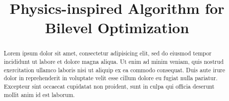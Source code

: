 \documentclass[conference]{IEEEtran}
\begin{document}
%
\title{Physics-inspired Algorithm for \\ Bilevel Optimization}


\author{
\and
}

\maketitle

\thispagestyle{firststyle}
\renewcommand{\headrulewidth}{0in}
\pagestyle{empty}


\pagestyle{fancy}



\begin{abstract}
Lorem ipsum dolor sit amet, consectetur adipisicing elit, sed do eiusmod
tempor incididunt ut labore et dolore magna aliqua. Ut enim ad minim veniam,
quis nostrud exercitation ullamco laboris nisi ut aliquip ex ea commodo
consequat. Duis aute irure dolor in reprehenderit in voluptate velit esse
cillum dolore eu fugiat nulla pariatur. Excepteur sint occaecat cupidatat non
proident, sunt in culpa qui officia deserunt mollit anim id est laborum.
\end{abstract}
\end{document}
